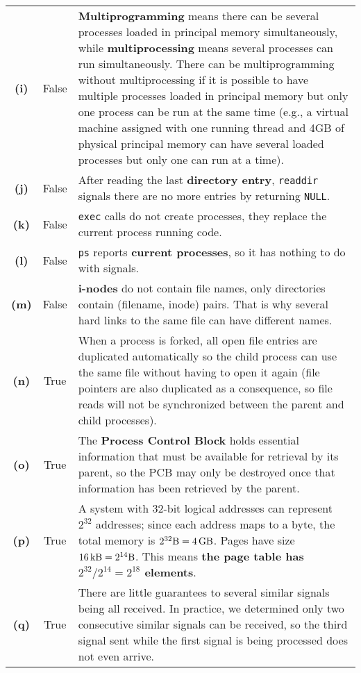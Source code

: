 {\begin{center}
\begin{longtable}{c | c p{132mm}}
        \textbf{(i)} & False & \textbf{Multiprogramming} means there can be several processes loaded in principal memory simultaneously, while \textbf{multiprocessing} means several processes can run simultaneously. There can be multiprogramming without multiprocessing if it is possible to have multiple processes loaded in principal memory but only one process can be run at the same time (e.g., a virtual machine assigned with one running thread and 4GB of physical principal memory can have several loaded processes but only one can run at a time). \\
        \textbf{(j)} & False & After reading the last \textbf{directory entry}, \texttt{readdir} signals there are no more entries by returning \texttt{NULL}. \\
        \textbf{(k)} & False & \texttt{exec} calls do not create processes, they replace the current process running code. \\
        \textbf{(l)} & False & \texttt{ps} reports \textbf{current processes}, so it has nothing to do with signals. \\
        \textbf{(m)} & False & \textbf{i-nodes} do not contain file names, only directories contain (filename, inode) pairs. That is why several hard links to the same file can have different names. \\
        \textbf{(n)} & True & When a process is forked, all open file entries are duplicated automatically so the child process can use the same file without having to open it again (file pointers are also duplicated as a consequence, so file reads will not be synchronized between the parent and child processes). \\
        \textbf{(o)} & True & The \textbf{Process Control Block} holds essential information that must be available for retrieval by its parent, so the PCB may only be destroyed once that information has been retrieved by the parent. \\
        \textbf{(p)} & True & A system with 32-bit logical addresses can represent $2^{32}$ addresses; since each address maps to a byte, the total memory is $2^{32}\SI{}{\byte}=\SI{4}{\giga \byte}$. Pages have size $\SI{16}{\kilo \byte}=2^{14}\SI{}{\byte}$. This means \textbf{the page table has $2^{32}/2^{14}=2^{18}$ elements}. \\
        \textbf{(q)} & True & There are little guarantees to several similar signals being all received. In practice, we determined only two consecutive similar signals can be received, so the third signal sent while the first signal is being processed does not even arrive. \\

\end{longtable}
\end{center}}
